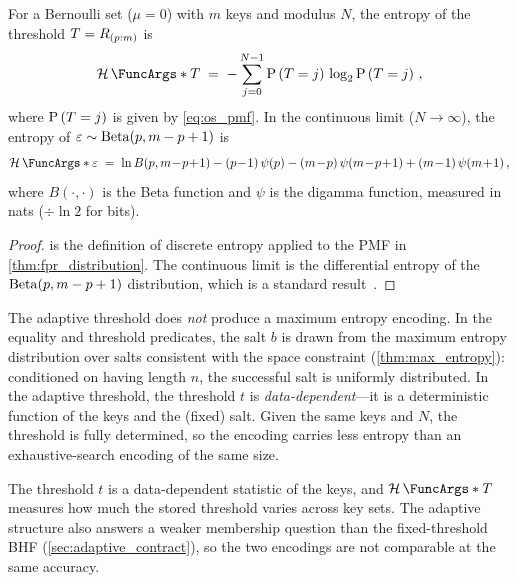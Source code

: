 \begin{theorem}
\label{thm:adaptive_entropy}
For a Bernoulli set ($\mu = 0$) with $m$ keys and modulus $N$, the entropy
of the threshold $T = R_{(p:m)}$ is
\begin{equation}
\label{eq:adaptive_entropy}
    \Entropy{T}
    \;=\; -\sum_{j=0}^{N-1} \Prob{T = j}\,\log_2 \Prob{T = j}\,,
\end{equation}
where $\Prob{T = j}$ is given by \cref{eq:os_pmf}.
In the continuous limit ($N \to \infty$), the entropy of
$\varepsilon \sim \operatorname{Beta}(p, m - p + 1)$ is
\begin{equation}
\label{eq:adaptive_entropy_beta}
    \Entropy{\fprate}
    \;=\; \ln B(p, m\!-\!p\!+\!1)
    - (p\!-\!1)\,\psi(p)
    - (m\!-\!p)\,\psi(m\!-\!p\!+\!1)
    + (m\!-\!1)\,\psi(m\!+\!1)\,,
\end{equation}
where $B(\cdot,\cdot)$ is the Beta function and $\psi$ is the digamma
function, measured in nats ($\div \ln 2$ for bits).
\end{theorem}
\begin{proof}
 is the definition of discrete entropy applied to
the PMF in \cref{thm:fpr_distribution}.
The continuous limit is the differential entropy of the
$\operatorname{Beta}(p, m - p + 1)$ distribution, which is a standard
result~\cite{order_statistics}.
\end{proof}

\begin{remark}
\label{rem:adaptive_not_max_entropy}
The adaptive threshold does \emph{not} produce a maximum entropy encoding.
In the equality and threshold predicates, the salt $b$ is drawn from the
maximum entropy distribution over salts consistent with the space constraint
(\cref{thm:max_entropy}): conditioned on having length $n$, the successful
salt is uniformly distributed.
In the adaptive threshold, the threshold $t$ is \emph{data-dependent}---it is
a deterministic function of the keys and the (fixed) salt.
Given the same keys and $N$, the threshold is fully determined, so the
encoding carries less entropy than an exhaustive-search encoding of the same
size.

The threshold $t$ is a data-dependent statistic of the keys, and $\Entropy{T}$
measures how much the stored threshold varies across key sets.
The adaptive structure also answers a weaker membership question than the
fixed-threshold BHF (\cref{sec:adaptive_contract}), so the two encodings are
not comparable at the same accuracy.
\end{remark}
